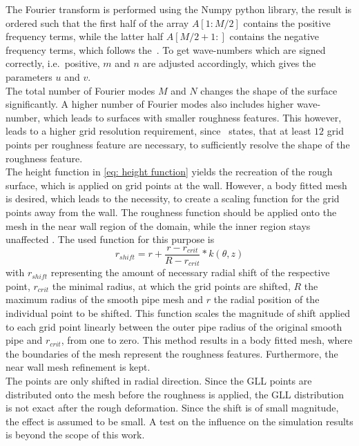 The Fourier transform is performed using the Numpy python library, the result is ordered such that the first half of the array $A[1:M/2]$ contains the positive frequency terms, while the latter half $A[M/2+1:]$ contains the negative frequency terms, which follows the~\cite{NumpyFT}.
To get wave-numbers which are signed correctly, i.e.\ positive, $m$ and $n$ are adjusted accordingly, which gives the parameters $u$ and $v$.\\
The total number of Fourier modes $M$ and $N$ changes the shape of the surface significantly.
A higher number of Fourier modes also includes higher wave-number, which leads to surfaces with smaller roughness features. 
This however, leads to a higher grid resolution requirement, since~\cite{chungPredictingDragRough2021} states, that at least $12$ grid points per roughness feature are necessary, to sufficiently resolve the shape of the roughness feature.\\
The height function in \autoref{eq: height function} yields the recreation of the rough surface, which is applied on grid points at the wall.
However, a body fitted mesh is desired, which leads to the necessity, to create a scaling function for the grid points away from the wall.
The roughness function should be applied onto the mesh in the near wall region of the domain, while the inner region stays unaffected \citep{chanSystematicInvestigationRoughness2015}.
The used function for this purpose is
\begin{equation}\label{eq: roughness scaling function}
    r_{shift} = r + \frac{r - r_{crit}}{R - r_{crit}} * k(\theta,z) 
\end{equation}
with $r_{shift}$ representing the amount of necessary radial shift of the respective point, $r_{crit}$ the minimal radius, at which the grid points are shifted, $R$ the maximum radius of the smooth pipe mesh and $r$ the radial position of the individual point to be shifted.
This function scales the magnitude of shift applied to each grid point linearly between the outer pipe radius of the original smooth pipe and $r_{crit}$, from one to zero.
This method results in a body fitted mesh, where the boundaries of the mesh represent the roughness features.
Furthermore, the near wall mesh refinement is kept.\\
The points are only shifted in radial direction.
Since the GLL points are distributed onto the mesh before the roughness is applied, the GLL distribution is not exact after the rough deformation.
Since the shift is of small magnitude, the effect is assumed to be small.
A test on the influence on the simulation results is beyond the scope of this work. 

